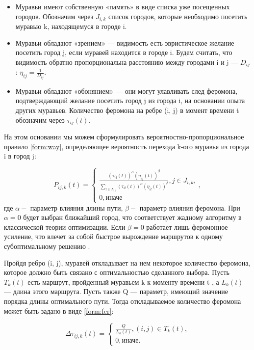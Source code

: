\begin{itemize}
	\item Муравьи имеют собственную «память» в виде списка уже посещенных городов. Обозначим через $J_{i, k}$ список городов, которые необходимо посетить муравью k, находящемуся в городе i.

	\item Муравьи обладают «зрением» — видимость есть эвристическое желание посетить город j, если муравей находится в городе i. Будем считать, что видимость обратно пропорциональна расстоянию между городами i и j — $D_{ij}$: $\eta_{ij} = \frac{1}{D_{ij}}$.
	\item Муравьи обладают «обонянием» — они могут улавливать след феромона, подтверждающий желание посетить город j из города i, на основании опыта других муравьев. Количество феромона на ребре (i, j) в момент времени t обозначим через $\tau_{ij}(t)$.
\end{itemize}

На этом основании мы можем сформулировать вероятностно-пропорциональное правило \ref{form:way}, определяющее вероятность перехода k-ого муравья из города i в город j:


\begin{equation}
	\label{form:way}
	P_{ij,k}(t) = \begin{cases}
		\frac {(\tau_{ij}(t))^{\alpha }(\eta_{ij}(t))^{\beta }}{\sum\limits_{l \in J_{i, k}}(\tau_{il}(t))^{\alpha }(\eta_{il}(t))^{\beta }}, \textrm{$j \in J_{i, k}$,} \\
		0, \textrm{иначе}
	\end{cases},
\end{equation}
где $\alpha - $ параметр влияния длины пути, $\beta - $ параметр влияния феромона. При $\alpha = 0$ будет выбран ближайший город, что соответствует жадному алгоритму в классической теории оптимизации. Если $\beta=0$ работает лишь феромонное усиление, что влечет за собой быстрое вырождение маршрутов к одному субоптимальному решению \cite{second_article}.

Пройдя ребро (i, j), муравей откладывает на нем некоторое количество феромона, которое должно быть связано с оптимальностью сделанного выбора.
Пусть $T_{k}(t)$ есть маршрут, пройденный муравьем k к моменту времени t , а $L_{k}(t)$ — длина этого маршрута. Пусть также Q — параметр, имеющий значение порядка длины оптимального пути. Тогда откладываемое количество феромона может быть задано в виде \ref{form:fer}:

\begin{equation}
	\label{form:fer}
	\Delta \tau_{ij, k}(t) = \begin{cases}
		\frac{Q}{L_{k}(t)}, \textrm{$(i, j) \in T_{k}(t)$,} \\
		0, \textrm{иначе.}
	\end{cases}
\end{equation}

